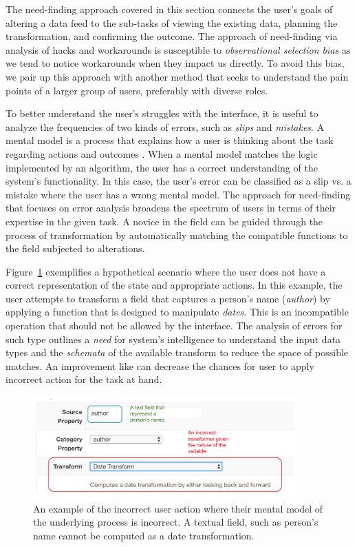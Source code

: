 \documentclass[12pt,letterpaper]{article}
\begin{document}
The need-finding approach covered in this section connects the user's goals of altering a data feed to the sub-tasks of viewing the existing data, planning the transformation, and confirming the outcome. The approach of need-finding via analysis of hacks and workarounds is susceptible to \textit{observational selection bias} as we tend to notice workarounds when they impact us directly. To avoid this bias, we pair up this approach with another method that seeks to understand the pain points of a larger group of users, preferably with diverse roles.


To better understand the user's struggles with the interface, it is useful to analyze the frequencies of two kinds of errors, such as \textit{slips} and \textit{mistakes}. A mental model is a process that explains how a user is thinking about the task regarding actions and outcomes \cite{wiki:mental_model}. When a mental model matches the logic implemented by an algorithm, the user has a correct understanding of the system's functionality. In this case, the user's error can be classified as a slip vs. a mistake where the user has a wrong mental model. The approach for need-finding that focuses on error analysis broadens the spectrum of users in terms of their expertise in the given task. A novice in the field can be guided through the process of transformation by automatically matching the compatible functions to the field subjected to alterations. 

Figure~\ref{fig::5} exemplifies a hypothetical scenario where the user does not have a correct representation of the state and appropriate actions. In this example, the user attempts to transform a field that captures a person's name (\textit{author}) by applying a function that is designed to manipulate \textit{dates}. This is an incompatible operation that should not be allowed by the interface. The analysis of errors for such type outlines a \textit{need} for system's intelligence to understand the input data types and the \textit{schemata} of the available transform to reduce the space of possible matches. An improvement like can decrease the chances for user to apply incorrect action for the task at hand.   

\begin{figure}[h]
\centering
\includegraphics[width=4in, scale=.3]{mistake.png}
\caption{An example of the incorrect user action where their mental model of the underlying process is incorrect. A textual field, such as person's name cannot be computed as a date transformation.}
\label{fig::5}
\end{figure}
\end{document}
